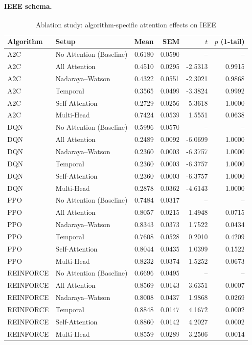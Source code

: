 \documentclass[12pt,oneside]{book}
\begin{document}
\paragraph{IEEE schema.}

\begin{table}[htbp]
\centering
\caption{Ablation study: algorithm-specific attention effects on IEEE}
\label{tab:ablation-algo-ieee}
\begin{tabular}{l l r r r r}
\toprule
\textbf{Algorithm} & \textbf{Setup} & \textbf{Mean} & \textbf{SEM} & \textbf{$t$} & \textbf{$p$ (1-tail)} \\
\midrule
A2C & No Attention (Baseline) & 0.6180 & 0.0590 & -- & -- \\
A2C & All Attention & 0.4510 & 0.0295 & -2.5313 & 0.9915 \\
A2C & Nadaraya--Watson & 0.4322 & 0.0551 & -2.3021 & 0.9868 \\
A2C & Temporal & 0.3565 & 0.0499 & -3.3824 & 0.9992 \\
A2C & Self-Attention & 0.2729 & 0.0256 & -5.3618 & 1.0000 \\
A2C & Multi-Head & 0.7424 & 0.0539 & 1.5551 & 0.0638 \\
DQN & No Attention (Baseline) & 0.5996 & 0.0570 & -- & -- \\
DQN & All Attention & 0.2489 & 0.0092 & -6.0699 & 1.0000 \\
DQN & Nadaraya--Watson & 0.2360 & 0.0003 & -6.3757 & 1.0000 \\
DQN & Temporal & 0.2360 & 0.0003 & -6.3757 & 1.0000 \\
DQN & Self-Attention & 0.2360 & 0.0003 & -6.3757 & 1.0000 \\
DQN & Multi-Head & 0.2878 & 0.0362 & -4.6143 & 1.0000 \\
PPO & No Attention (Baseline) & 0.7484 & 0.0317 & -- & -- \\
PPO & All Attention & 0.8057 & 0.0215 & 1.4948 & 0.0715 \\
PPO & Nadaraya--Watson & 0.8343 & 0.0373 & 1.7522 & 0.0434 \\
PPO & Temporal & 0.7608 & 0.0528 & 0.2010 & 0.4209 \\
PPO & Self-Attention & 0.8044 & 0.0435 & 1.0399 & 0.1522 \\
PPO & Multi-Head & 0.8232 & 0.0374 & 1.5252 & 0.0673 \\
REINFORCE & No Attention (Baseline) & 0.6696 & 0.0495 & -- & -- \\
REINFORCE & All Attention & 0.8569 & 0.0143 & 3.6351 & 0.0007 \\
REINFORCE & Nadaraya--Watson & 0.8008 & 0.0437 & 1.9868 & 0.0269 \\
REINFORCE & Temporal & 0.8848 & 0.0147 & 4.1672 & 0.0002 \\
REINFORCE & Self-Attention & 0.8860 & 0.0142 & 4.2027 & 0.0002 \\
REINFORCE & Multi-Head & 0.8559 & 0.0289 & 3.2506 & 0.0014 \\
\bottomrule
\end{tabular}
\end{table}
\end{document}
